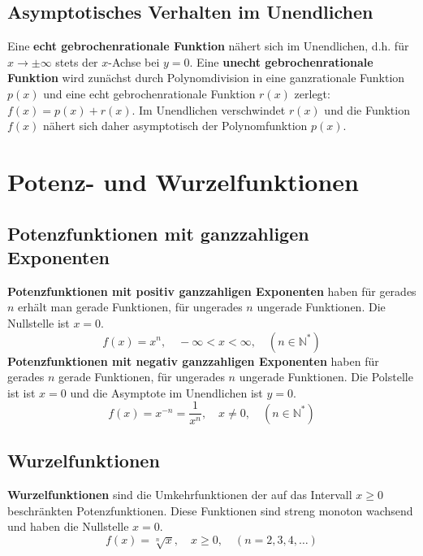 \subsection{Asymptotisches Verhalten im Unendlichen}
Eine \textbf{echt gebrochenrationale Funktion} nähert sich im Unendlichen, d.h. für $x\rightarrow \pm\infty$ stets der $x$-Achse bei $y=0$.
\newline\newline
Eine \textbf{unecht gebrochenrationale Funktion} wird zunächst durch Polynomdivision in eine ganzrationale Funktion $p\left(x\right)$ und eine echt gebrochenrationale Funktion $r\left(x\right)$ zerlegt: $f\left(x\right)=p\left(x\right)+r\left(x\right)$. Im Unendlichen verschwindet $r\left(x\right)$ und die Funktion $f\left(x\right)$ nähert sich daher asymptotisch der Polynomfunktion $p\left(x\right)$.
\section{Potenz- und Wurzelfunktionen}
\subsection{Potenzfunktionen mit ganzzahligen Exponenten}
\textbf{Potenzfunktionen mit positiv ganzzahligen Exponenten} haben für gerades $n$ erhält man gerade Funktionen, für ungerades $n$ ungerade Funktionen. Die Nullstelle ist $x=0$.
\begin{equation}
\boxed{f\left(x\right)=x^n,\quad -\infty < x < \infty,\quad \left(n\in \mathbb{N}^*\right)}
\end{equation}
\textbf{Potenzfunktionen mit negativ ganzzahligen Exponenten} haben für gerades $n$ gerade Funktionen, für ungerades $n$ ungerade Funktionen. Die Polstelle ist ist $x=0$ und die Asymptote im Unendlichen ist $y=0$.
\begin{equation}
\boxed{f\left(x\right)=x^{-n}=\dfrac{1}{x^n},\quad x\neq 0,\quad \left(n\in \mathbb{N}^*\right)}
\end{equation}
\subsection{Wurzelfunktionen}
\textbf{Wurzelfunktionen} sind die Umkehrfunktionen der auf das Intervall $x\geq 0$ beschränkten Potenzfunktionen. Diese Funktionen sind streng monoton wachsend und haben die Nullstelle $x=0$.
\begin{equation} 
\boxed{f\left(x\right)=\sqrt[n]{x},\quad x\geq 0,\quad \left(n=2, 3, 4, \dotso\right)}
\end{equation}
